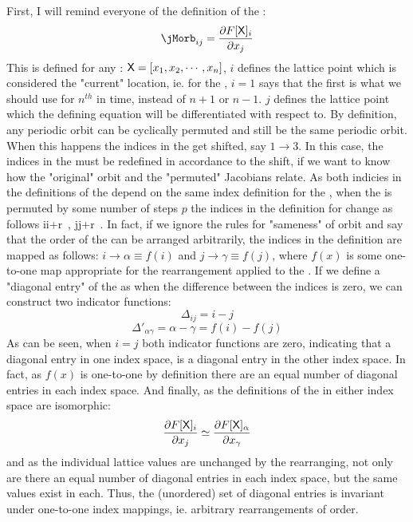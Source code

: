 \begin{description}
First, I will remind everyone of the definition of the  {\jacobianOrb}:
$$\jMorb_{ij}=\frac{\partial F[\Xx]_i}{\partial \ssp_j}$$
This is defined for any {\lattstate}:
$\mathsf{X}=[x_1,x_2,\cdots ,x_n]$, $i$ defines the lattice point which
is considered the "current" location, ie. for the {\henlatt}, $i=1$ says
that the first {\lattstate} is what we should use for $n^{th}$ in time,
instead of $n+1$ or $n-1$. $j$ defines the lattice point which the
defining equation will be differentiated with respect to. By definition,
any periodic orbit can be cyclically permuted and still be the same
periodic orbit. When this happens the indices in the {\lattstate} get
shifted, say $1\rightarrow 3$. In this case, the indices in the  {\jacobianOrb} must be redefined in accordance to the shift, if we want to know
how the "original" orbit and the "permuted" Jacobians relate. As both
indicies in the definitions of the  {\jacobianOrb} depend on the same
index definition for the {\lattstate}, when the {\lattstate} is permuted
by some number of steps $p$ the indices in the definition for  {\jacobianOrb} change as follows
\beq
i\rightarrow\alpha\equiv i+r
\,,\quad
j\rightarrow\gamma\equiv j+r
\,.
In fact, if we ignore the rules for
"sameness" of orbit and say that the order of the {\lattstate} can be
arranged arbitrarily, the indices in the  {\jacobianOrb} definition are
mapped as follows: $i\rightarrow\alpha\equiv f(i)$ and $j\rightarrow
\gamma\equiv f(j)$, where $f(x)$ is some one-to-one map appropriate for
the rearrangement applied to the {\lattstate}. If we define a "diagonal
entry" of the  {\jacobianOrb} as when the difference between the indices
is zero, we can construct two indicator functions:
$$\Delta_{ij}=i-j$$
$$\Delta'_{\alpha\gamma}=\alpha-\gamma=f(i)-f(j)$$
As can be seen, when $i=j$ both indicator functions are zero, indicating that a diagonal entry in one index space, is a diagonal entry in the other index space. In fact, as $f(x)$ is one-to-one by definition there are an equal number of diagonal entries in each index space. And finally, as the definitions of the  {\jacobianOrb} in either index space are isomorphic:
$$\frac{\partial F[\mathsf{X}]_i}{\partial x_j}\simeq \frac{\partial F[\mathsf{X}]_{\alpha}}{\partial x_{\gamma}}$$
and as the individual lattice values are unchanged by the rearranging, not only are there an equal number of diagonal entries in each index space, but the same values exist in each. Thus, the (unordered) set of diagonal  {\jacobianOrb} entries is invariant under one-to-one index mappings, ie. arbitrary rearrangements of {\lattstate} order.


\end{description}
